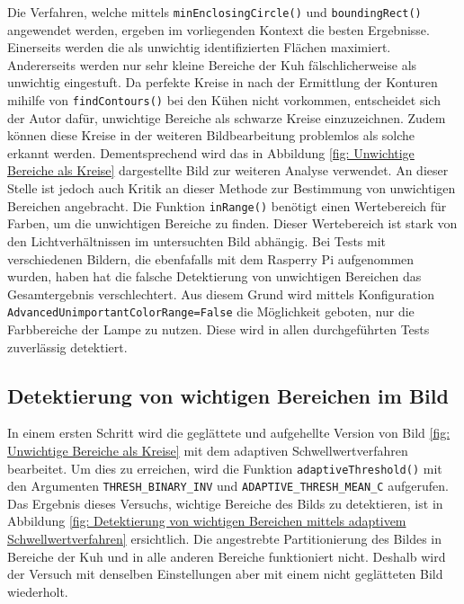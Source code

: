 Die Verfahren, welche mittels \texttt{minEnclosingCircle()} und \texttt{boundingRect()} angewendet werden, ergeben im vorliegenden Kontext die besten Ergebnisse. Einerseits werden die als unwichtig identifizierten Flächen  maximiert. Andererseits werden nur sehr kleine Bereiche der Kuh fälschlicherweise als unwichtig eingestuft. Da perfekte Kreise in nach der Ermittlung der Konturen mihilfe von \texttt{findContours()} bei den Kühen nicht vorkommen, entscheidet sich der Autor dafür, unwichtige Bereiche als schwarze Kreise einzuzeichnen. Zudem können diese Kreise in der weiteren Bildbearbeitung problemlos als solche erkannt werden.
Dementsprechend wird das in Abbildung \ref{fig: Unwichtige Bereiche als Kreise} dargestellte Bild zur weiteren Analyse verwendet.
An dieser Stelle ist jedoch auch Kritik an dieser Methode zur Bestimmung von unwichtigen Bereichen angebracht. Die Funktion \texttt{inRange()} benötigt einen Wertebereich für Farben, um die unwichtigen Bereiche zu finden. Dieser Wertebereich ist stark von den Lichtverhältnissen im untersuchten Bild abhängig. Bei Tests mit verschiedenen Bildern, die ebenfafalls mit dem Rasperry Pi aufgenommen wurden, haben hat die falsche Detektierung von unwichtigen Bereichen das Gesamtergebnis verschlechtert. Aus diesem Grund wird mittels Konfiguration \texttt{AdvancedUnimportantColorRange=False} die Möglichkeit geboten, nur die Farbbereiche der Lampe zu nutzen. Diese wird in allen durchgeführten Tests zuverlässig detektiert.  
\subsection{Detektierung von wichtigen Bereichen im Bild}



In einem ersten Schritt wird die geglättete und aufgehellte Version von Bild \ref{fig: Unwichtige Bereiche als Kreise} mit dem adaptiven Schwellwertverfahren bearbeitet. Um dies zu erreichen, wird die Funktion \texttt{adaptiveThreshold()} mit den Argumenten \texttt{THRESH_BINARY_INV} und \texttt{ADAPTIVE_THRESH_MEAN_C} aufgerufen. Das Ergebnis dieses Versuchs, wichtige Bereiche des Bilds zu detektieren, ist in Abbildung \ref{fig: Detektierung von wichtigen Bereichen mittels adaptivem Schwellwertverfahren} ersichtlich. Die angestrebte Partitionierung des Bildes in Bereiche der Kuh und in alle anderen Bereiche funktioniert nicht. Deshalb wird der Versuch mit denselben Einstellungen aber mit einem nicht geglätteten Bild wiederholt.

